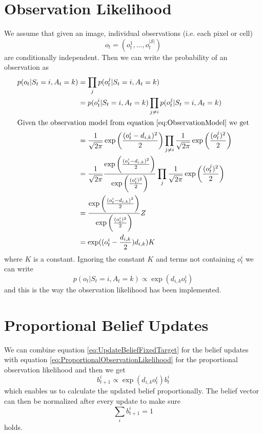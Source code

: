 \section{Observation Likelihood}
\label{sec:ObservationLikelihoodImpl}
We assume that given an image, individual observations (i.e. each pixel or cell)
\begin{equation}
  o_t = (o_t^1, \dotsc, o_t^{|\mathcal{S}|})
\end{equation}
are conditionally independent. Then we can write the probability of an observation as
\begin{subequations}
  \begin{align}
    p(o_t | S_t = i, A_t = k) 
      &= \prod_j p(o_t^j | S_t = i, A_t = k) \\
      &= p(o_t^i | S_t = i, A_t = k) \prod_{j \neq i} p(o_t^j | S_t = i, A_t = k) \\
      \intertext{Given the observation model from equation \eqref{eq:ObservationModel} we get}
      &= \frac{1}{\sqrt{2 \pi}} \exp\bigg(\frac{(o_t^i - d_{i,k})^2}{2}\bigg) \prod_{j \neq i} \frac{1}{\sqrt{2 \pi}} \exp\bigg(\frac{(o_t^j)^2}{2}\bigg) \\
      &= \frac{1}{\sqrt{2\pi}} \frac{\exp\bigg(\frac{(o_t^i - d_{i,k})^2}{2}\bigg)}{\exp\bigg(\frac{(o_t^i)^2}{2}\bigg)} \prod_j \frac{1}{\sqrt{2 \pi}} \exp\bigg(\frac{(o_t^j)^2}{2}\bigg) \\
      &= \frac{\exp\bigg(\frac{(o_t^i - d_{i,k})^2}{2}\bigg)}{\exp\bigg(\frac{(o_t^i)^2}{2}\bigg)} Z \\
      &= \exp((o_t^i - \frac{d_{i,k}}{2}) d_{i,k}) K
  \end{align}
\end{subequations}
where $K$ is a constant. Ignoring the constant $K$ and terms not containing $o_t^i$ we can write
\begin{equation}
\label{eq:ProportionalObservationLikelihood}
  p(o_t | S_t = i, A_t = k) \propto \exp{(d_{i,k} o_t^i)}
\end{equation}
and this is the way the observation likelihood has been implemented.

\section{Proportional Belief Updates}
\label{sec:ProportinalBeliefUpdates}
We can combine equation \eqref{eq:UpdateBeliefFixedTarget} for the belief updates with equation \eqref{eq:ProportionalObservationLikelihood} for the proportional observation likelihood and then we get
\begin{equation}
  b_{t+1}^i \propto \exp{(d_{i,k} o_t^i)} b_t^i
\end{equation}
which enables us to calculate the updated belief proportionally. The belief vector can then be normalized after every update to make sure 
\begin{equation}
  \sum_i{b_{t+1}^i} = 1
\end{equation}
holds.
